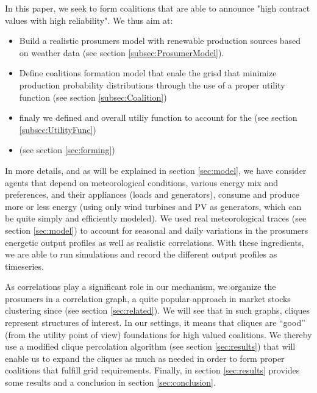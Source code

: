 \documentclass[conference]{IEEEtran}
\begin{document}
In this paper, we seek to form coalitions that are able to announce "high contract values with high reliability". We thus aim at:
\begin{itemize}
\item Build a realistic prosumers model with renewable production sources based on weather data (see section \ref{subsec:ProsumerModel}).
\item Define coalitions formation model that enale the grisd that minimize production probability distributions through the use of a proper utility function (see section \ref{subsec:Coalition})
\item finaly we defined and overall utiliy function to account for the  (see section \ref{subsec:UtilityFunc})
\item (see section \ref{sec:forming})
\end{itemize}

In more details, and as will be explained in section \ref{sec:model}, we have consider agents that depend on meteorological conditions, various energy mix and  preferences, and their appliances (loads and generators), consume and produce more or less energy (using only wind turbines and PV as generators, which can be quite simply and efficiently modeled). We used real meteorological traces (see section \ref{sec:model}) to account for seasonal and daily variations in the prosumers energetic output profiles as well as realistic correlations. With these ingredients, we are able to run simulations and record the different output profiles as timeseries.

As correlations play a significant role in our mechanism, we organize the prosumers in a correlation graph, a quite popular approach in market stocks clustering since \cite{Mantegna1999} (see section \ref{sec:related}). We will see that in such graphs, cliques represent structures of interest. In our settings, it means that cliques are “good” (from the utility point of view) foundations for high valued coalitions. We thereby use a modified clique percolation algorithm (see section \ref{sec:results}) that will enable us to expand the cliques as much as needed in order to form proper coalitions that fulfill grid requirements. Finally, in section \ref{sec:results} provides some results and a conclusion in section \ref{sec:conclusion}.

%
%
\end{document}
